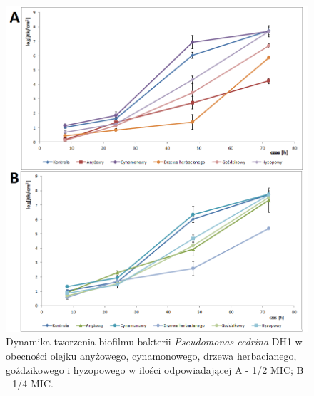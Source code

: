\documentclass[11pt,a4paper]{report}
\begin{document}
\begin{figure}[!h]
\begin{center}
\includegraphics[scale=0.65]{img/dh1-a.png}
\caption{Dynamika tworzenia biofilmu bakterii \textit{Pseudomonas cedrina} DH1 w obecności olejku anyżowego, cynamonowego, drzewa herbacianego, goździkowego i hyzopowego w ilości odpowiadającej A - 1/2 MIC; B - 1/4 MIC.}\label{dh1-a}
\end{center} 
\end{figure}
\end{document}
